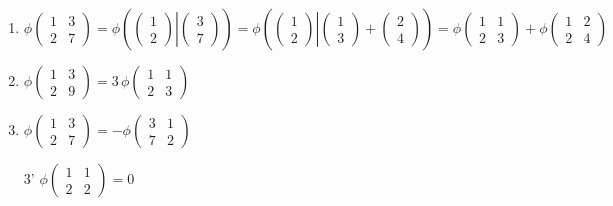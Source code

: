 \begin{enumerate}
\item
$
\phi
\begin{pmatrix}
{1}&{3}\\
{2}&{7}
\end{pmatrix}
=
\phi
\left(\left.
\begin{pmatrix}
{1}\\{2}
\end{pmatrix}
\right|
\begin{pmatrix}
{3}\\{7}
\end{pmatrix}
\right)
=
\phi
\left(\left.
\begin{pmatrix}
{1}\\{2}
\end{pmatrix}
\right|
\begin{pmatrix}
{1}\\{3}
\end{pmatrix}
+
\begin{pmatrix}
{2}\\{4}
\end{pmatrix}
\right)
=
\phi
\begin{pmatrix}
{1}&{1}\\
{2}&{3}
\end{pmatrix}
+
\phi
\begin{pmatrix}
{1}&{2}\\
{2}&{4}
\end{pmatrix}
$

\item
$
\phi
\begin{pmatrix}
{1}&{3}\\
{2}&{9}
\end{pmatrix}
=
3\,
\phi
\begin{pmatrix}
{1}&{1}\\
{2}&{3}
\end{pmatrix}
$

\item
$
\phi
\begin{pmatrix}
{1}&{3}\\
{2}&{7}
\end{pmatrix}
=-
\phi
\begin{pmatrix}
{3}&{1}\\
{7}&{2}
\end{pmatrix}
$

\item[3']
$
\phi
\begin{pmatrix}
{1}&{1}\\
{2}&{2}
\end{pmatrix}
=0
$
\end{enumerate}

